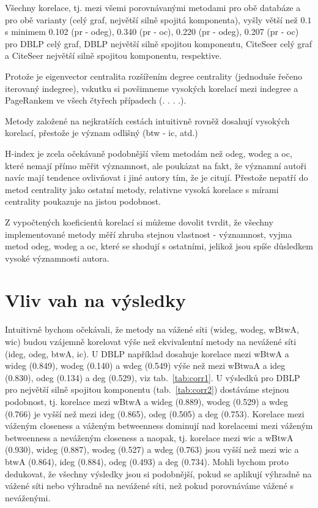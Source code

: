 \documentclass{bakalarka}
\begin{document}
Všechny korelace, tj. mezi všemi porovnávanými metodami pro obě databáze a pro
obě varianty (celý graf, největší silně spojitá komponenta), vyšly větší než
$0.1$ s minimem 0.102 (pr - odeg), 0.340 (pr - oc), 0.220 (pr - odeg), 0.207
(pr - oc) pro DBLP celý graf, DBLP největší silně spojitou komponentu, CiteSeer
celý graf a CiteSeer největší silně spojitou komponentu, respektive. 


Protože je eigenvector centralita rozšířením degree centrality (jednoduše
řečeno iterovaný indegree), vskutku si povšimneme vysokých korelací mezi
indegree a PageRankem ve všech čtyřech případech (. . . .).

Metody založené na nejkratších cestách intuitivně rovněž dosahují vysokých
korelací, přestože je význam odlišný (btw - ic, atd.)

H-index je zcela očekávaně podobnější všem metodám než odeg, wodeg a oc, které
nemají přímo měřit významnost, ale poukázat na fakt, že významní autoři navíc
mají tendence ovlivňovat i jiné autory tím, že je citují. Přestože nepatří do
metod centrality jako ostatní metody, relativne vysoká korelace s mírami
centrality poukazuje na jistou podobnost.


Z vypočtených koeficientů korelací si můžeme dovolit tvrdit, že všechny
implementované metody měří zhruba stejnou vlastnost - významnost, vyjma metod
odeg, wodeg a oc, které se shodují s ostatními, jelikož jsou spíše důsledkem
vysoké významnosti autora.

\section{Vliv vah na výsledky}
Intuitivně bychom očekávali, že metody na vážené síti (wideg, wodeg, wBtwA,
wic) budou vzájemně korelovat výše než ekvivalentní metody na nevážené síti
(ideg, odeg, btwA, ic). U DBLP například dosahuje korelace mezi wBtwA a wideg
(0.849), wodeg (0.140) a wdeg (0.549) výše než mezi wBtwaA a ideg (0.830), odeg
(0.134) a deg (0.529), viz tab.~\ref{tab:corr1}. U výsledků pro DBLP pro
největší silně spojitou komponentu (tab.~\ref{tab:corr2}) dostáváme stejnou
podobnost, tj. korelace mezi wBtwA a wideg (0.889), wodeg (0.529) a wdeg
(0.766) je vyšší než mezi ideg (0.865), odeg (0.505) a deg (0.753).  Korelace
mezi váženým closeness a váženým betweenness dominují nad korelacemi mezi
váženým betweenness a neváženým closeness a naopak, tj. korelace mezi wic a
wBtwA (0.930), wideg (0.887), wodeg (0.527) a wdeg (0.763) jsou vyšší než mezi
wic a btwA (0.864), ideg (0.884), odeg (0.493) a deg (0.734).  Mohli bychom
proto dedukovat, že všechny výsledky jsou si podobnější, pokud se aplikují
výhradně na vážené síti nebo výhradně na nevážené síti, než pokud porovnáváme
vážené s neváženými.
\end{document}
